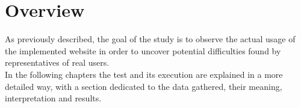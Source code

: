 \documentclass[../../UsabilityReport.tex]{subfiles}
\begin{document}
\section{Overview}
	As previously described, the goal of the study is to observe the actual usage of the implemented website in order to uncover potential difficulties found by representatives of real users. \\
	In the following chapters the test and its execution are explained in a more detailed way, with a section dedicated to the data gathered, their meaning, interpretation and results.
\end{document}
